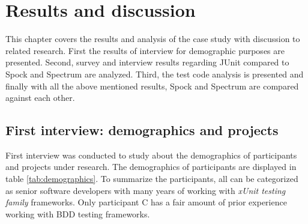 \chapter{Results and discussion}
\label{chapter:results}

This chapter covers the results and analysis of the case study with discussion to related research.
First the results of interview for demographic purposes are
presented. Second, survey and interview results regarding JUnit compared to Spock and Spectrum are analyzed.  Third, the test
code analysis is presented and finally
with all the above mentioned results, Spock and Spectrum are compared against each other.

\section{First interview: demographics and projects}
\label{section:demographics}
    First interview was conducted to study about the demographics of participants and projects under research.
    The demographics of participants are displayed in table \ref{tab:demographics}. To summarize the
    participants, all can be categorized as senior software developers with many years of working with \textit{xUnit testing family} frameworks.
    Only participant C has a fair amount of prior experience working with BDD testing frameworks.
